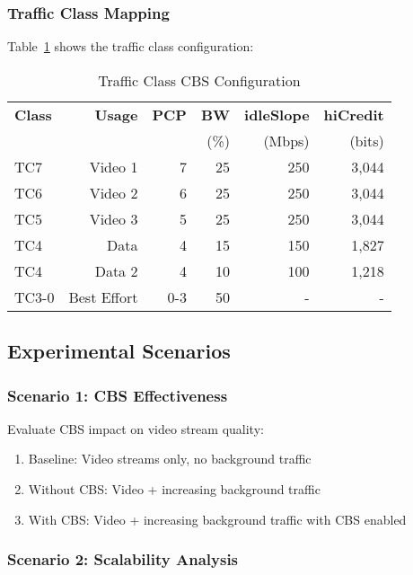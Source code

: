 \documentclass[10pt, journal, compsoc]{IEEEtran}
\begin{document}
\subsubsection{Traffic Class Mapping}

Table~\ref{tab:tc_mapping} shows the traffic class configuration:

\begin{table}[h]
\centering
\caption{Traffic Class CBS Configuration}
\label{tab:tc_mapping}
\begin{tabular}{lrrrrr}
\toprule
\textbf{Class} & \textbf{Usage} & \textbf{PCP} & \textbf{BW} & \textbf{idleSlope} & \textbf{hiCredit} \\
 & & & (\%) & (Mbps) & (bits) \\
\midrule
TC7 & Video 1 & 7 & 25 & 250 & 3,044 \\
TC6 & Video 2 & 6 & 25 & 250 & 3,044 \\
TC5 & Video 3 & 5 & 25 & 250 & 3,044 \\
TC4 & Data & 4 & 15 & 150 & 1,827 \\
TC4 & Data 2 & 4 & 10 & 100 & 1,218 \\
TC3-0 & Best Effort & 0-3 & 50 & - & - \\
\bottomrule
\end{tabular}
\end{table}

\subsection{Experimental Scenarios}

\subsubsection{Scenario 1: CBS Effectiveness}

Evaluate CBS impact on video stream quality:
\begin{enumerate}
    \item Baseline: Video streams only, no background traffic
    \item Without CBS: Video + increasing background traffic
    \item With CBS: Video + increasing background traffic with CBS enabled
\end{enumerate}

\subsubsection{Scenario 2: Scalability Analysis}
\end{document}
